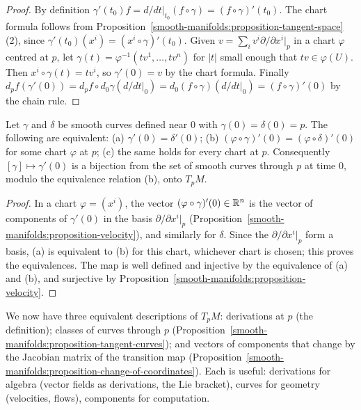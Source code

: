 \begin{proof}
By definition $\gamma'(t_0)f = d/dt|_{t_0}(f \circ \gamma) = (f \circ \gamma)'(t_0)$. The chart formula follows from
Proposition~\ref{smooth-manifolds:proposition-tangent-space}(2), since $\gamma'(t_0)(x^i) = (x^i \circ \gamma)'(t_0)$. Given
$v = \sum_iv^i\partial/\partial x^i|_p$ in a chart $\varphi$ centred at $p$, let $\gamma(t) = \varphi^{-1}(tv^1, \ldots, tv^n)$ for $|t|$ small enough that
$tv \in \varphi(U)$. Then $x^i \circ \gamma(t) = tv^i$, so $\gamma'(0) = v$ by the chart formula. Finally
$d_pf(\gamma'(0)) = d_pf \circ d_0\gamma(d/dt|_0) = d_0(f \circ \gamma)(d/dt|_0) = (f \circ \gamma)'(0)$ by the chain rule.
\end{proof}

\begin{proposition}\label{smooth-manifolds:proposition-tangent-curves}
Let $\gamma$ and $\delta$ be smooth curves defined near $0$ with $\gamma(0) = \delta(0) = p$. The following are equivalent: (a) $\gamma'(0) = \delta'(0)$;
(b) $(\varphi \circ \gamma)'(0) = (\varphi \circ \delta)'(0)$ for some chart $\varphi$ at $p$; (c) the same holds for every chart at $p$. Consequently
$[\gamma] \mapsto \gamma'(0)$ is a bijection from the set of smooth curves through $p$ at time $0$, modulo the equivalence relation (b), onto $T_pM$.
\end{proposition}

\begin{proof}
In a chart $\varphi = (x^i)$, the vector $(\varphi \circ \gamma)'(0) \in \mathbb{R}^n$ is the vector of components of $\gamma'(0)$ in the basis
$\partial/\partial x^i|_p$ (Proposition~\ref{smooth-manifolds:proposition-velocity}), and similarly for $\delta$. Since the $\partial/\partial x^i|_p$ form a
basis, (a) is equivalent to (b) for this chart, whichever chart is chosen; this proves the equivalences. The map is well defined and injective by the
equivalence of (a) and (b), and surjective by Proposition~\ref{smooth-manifolds:proposition-velocity}.
\end{proof}

\begin{remark}\label{smooth-manifolds:remark-three-definitions}
We now have three equivalent descriptions of $T_pM$: derivations at $p$ (the definition); classes of curves through $p$
(Proposition~\ref{smooth-manifolds:proposition-tangent-curves}); and vectors of components that change by the Jacobian matrix of the transition map
(Proposition~\ref{smooth-manifolds:proposition-change-of-coordinates}). Each is useful: derivations for algebra (vector fields as derivations, the Lie
bracket), curves for geometry (velocities, flows), components for computation.
\end{remark}

